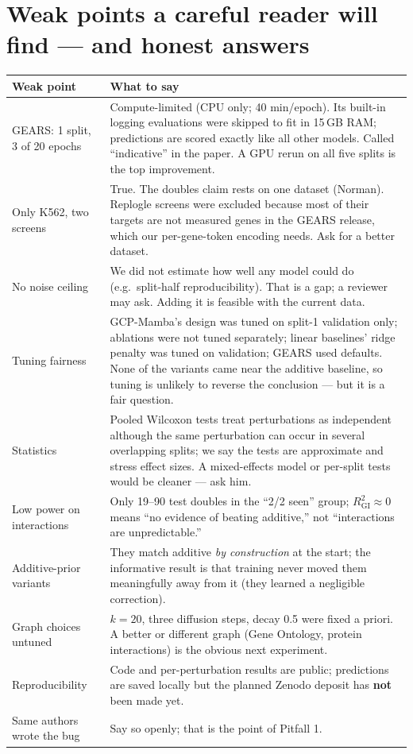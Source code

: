 \documentclass[10.5pt]{article}
\begin{document}
\section{Weak points a careful reader will find --- and honest answers}

\begin{tabular}{@{}p{4.1cm}p{11.4cm}@{}}
\toprule
Weak point & What to say\\
\midrule
GEARS: 1 split, 3 of 20 epochs & Compute-limited (CPU only; 40 min/epoch). Its built-in logging evaluations
were skipped to fit in 15\,GB RAM; predictions are scored exactly like all other models. Called ``indicative''
in the paper. A GPU rerun on all five splits is the top improvement.\\
Only K562, two screens & True. The doubles claim rests on one dataset (Norman). Replogle screens were excluded
because most of their targets are not measured genes in the GEARS release, which our per-gene-token encoding
needs. Ask for a better dataset.\\
No noise ceiling & We did not estimate how well any model could do (e.g.\ split-half reproducibility). That is
a gap; a reviewer may ask. Adding it is feasible with the current data.\\
Tuning fairness & GCP-Mamba's design was tuned on split-1 validation only; ablations were not tuned
separately; linear baselines' ridge penalty was tuned on validation; GEARS used defaults. None of the variants
came near the additive baseline, so tuning is unlikely to reverse the conclusion --- but it is a fair
question.\\
Statistics & Pooled Wilcoxon tests treat perturbations as independent although the same perturbation can occur
in several overlapping splits; we say the tests are approximate and stress effect sizes. A mixed-effects
model or per-split tests would be cleaner --- ask him.\\
Low power on interactions & Only 19--90 test doubles in the ``2/2 seen'' group; $R^2_{\mathrm{GI}}\approx0$ means
``no evidence of beating additive,'' not ``interactions are unpredictable.''\\
Additive-prior variants & They match additive \emph{by construction} at the start; the informative result is that
training never moved them meaningfully away from it (they learned a negligible correction).\\
Graph choices untuned & $k=20$, three diffusion steps, decay 0.5 were fixed a priori. A better or different graph
(Gene Ontology, protein interactions) is the obvious next experiment.\\
Reproducibility & Code and per-perturbation results are public; predictions are saved locally but the planned
Zenodo deposit has \textbf{not} been made yet.\\
Same authors wrote the bug & Say so openly; that is the point of Pitfall 1.\\
\bottomrule
\end{tabular}
\end{document}
